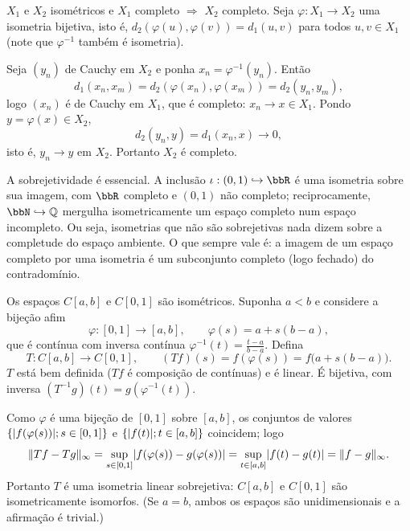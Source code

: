 \begin{exercicio}{$X_1$ e $X_2$ isométricos e $X_1$ completo $\Rightarrow$ $X_2$ completo.}
\sol
Seja $\varphi:X_1\to X_2$ uma isometria bijetiva, isto é, $d_2(\varphi(u),\varphi(v))=d_1(u,v)$ para todos $u,v\in X_1$ (note que $\varphi^{-1}$ também é isometria).

Seja $(y_n)$ de Cauchy em $X_2$ e ponha $x_n=\varphi^{-1}(y_n)$. Então
\[ d_1(x_n,x_m)=d_2(\varphi(x_n),\varphi(x_m))=d_2(y_n,y_m), \]
logo $(x_n)$ é de Cauchy em $X_1$, que é completo: $x_n\to x\in X_1$. Pondo $y=\varphi(x)\in X_2$,
\[ d_2(y_n,y)=d_1(x_n,x)\longrightarrow0, \]
isto é, $y_n\to y$ em $X_2$. Portanto $X_2$ é completo.

\begin{obs}
A sobrejetividade é essencial. A inclusão $\iota:(0,1)\hookrightarrow\R$ é uma isometria sobre sua imagem, com $\R$ completo e $(0,1)$ não completo; reciprocamente, $\N\hookrightarrow\mathbb{Q}$ mergulha isometricamente um espaço completo num espaço incompleto. Ou seja, isometrias que não são sobrejetivas nada dizem sobre a completude do espaço ambiente. O que sempre vale é: a imagem de um espaço completo por uma isometria é um subconjunto completo (logo fechado) do contradomínio.
\end{obs}
\end{exercicio}
\begin{exercicio}{Os espaços $C[a,b]$ e $C[0,1]$ são isométricos.}
\sol
Suponha $a<b$ e considere a bijeção afim
\[ \varphi:[0,1]\to[a,b],\qquad \varphi(s)=a+s(b-a), \]
que é contínua com inversa contínua $\varphi^{-1}(t)=\frac{t-a}{b-a}$. Defina
\[ T:C[a,b]\to C[0,1],\qquad (Tf)(s)=f(\varphi(s))=f\bigl(a+s(b-a)\bigr). \]
$T$ está bem definida ($Tf$ é composição de contínuas) e é linear. É bijetiva, com inversa $(T^{-1}g)(t)=g(\varphi^{-1}(t))$.

Como $\varphi$ é uma bijeção de $[0,1]$ sobre $[a,b]$, os conjuntos de valores $\{\lvert f(\varphi(s))\rvert;s\in[0,1]\}$ e $\{\lvert f(t)\rvert;t\in[a,b]\}$ coincidem; logo
\[ \lVert Tf-Tg\rVert_\infty=\sup_{s\in[0,1]}\lvert f(\varphi(s))-g(\varphi(s))\rvert=\sup_{t\in[a,b]}\lvert f(t)-g(t)\rvert=\lVert f-g\rVert_\infty. \]
Portanto $T$ é uma isometria linear sobrejetiva: $C[a,b]$ e $C[0,1]$ são isometricamente isomorfos. (Se $a=b$, ambos os espaços são unidimensionais e a afirmação é trivial.)
\end{exercicio}

